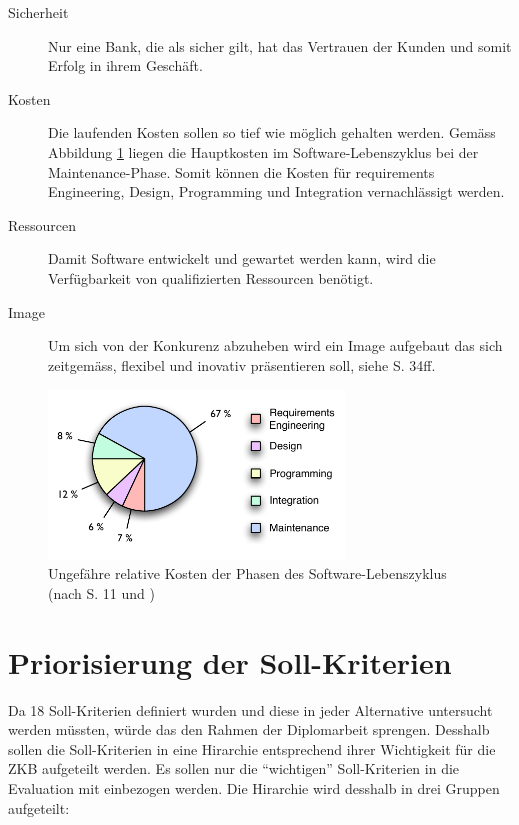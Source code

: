   \begin{description}
    \item[Sicherheit]
    Nur eine Bank, die als sicher gilt, hat das Vertrauen der Kunden und somit
    Erfolg in ihrem Geschäft.
    \item[Kosten]
    Die laufenden Kosten sollen so tief wie möglich gehalten werden. Gemäss
    Abbildung \ref{img:softwareLifecycleCost} liegen die Hauptkosten im
    Software-Lebenszyklus bei der Maintenance-Phase. Somit können die Kosten für
    requirements Engineering, Design, Programming und Integration vernachlässigt
    werden.
    \item[Ressourcen]
    Damit Software entwickelt und gewartet werden kann, wird die Verfügbarkeit
    von qualifizierten Ressourcen benötigt.
    \item[Image]
    Um sich von der Konkurenz abzuheben wird ein Image aufgebaut das sich
    zeitgemäss, flexibel und inovativ präsentieren soll, siehe
    \cite{WillkommenBeiDerZkb} S. 34ff.
  \end{description}
  
  \begin{figure}[ht]
    \begin{center}
      \includegraphics[width=0.7\textwidth]{./image/softwareLifeCycleCost.pdf}
      \caption{Ungefähre relative Kosten der Phasen des Software-Lebenszyklus
      (nach \cite{SoftwareEngineering} S. 11 und
      \cite{SoftwareLifeCycleModels})}
      \label{img:softwareLifecycleCost}
    \end{center}
  \end{figure}
    
  \section{Priorisierung der Soll-Kriterien}
  
  Da 18 Soll-Kriterien definiert wurden und diese in jeder Alternative 
  untersucht werden müssten, würde das den Rahmen der Diplomarbeit sprengen.
  Desshalb sollen die Soll-Kriterien in eine Hirarchie entsprechend ihrer
  Wichtigkeit für die \ac{ZKB} aufgeteilt werden. Es sollen nur die
  ``wichtigen'' Soll-Kriterien in die Evaluation mit einbezogen werden. Die
  Hirarchie wird desshalb in drei Gruppen aufgeteilt:
  
